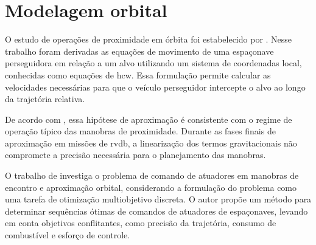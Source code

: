 \section{Modelagem orbital}
\label{sec_modelagem_orbital}

O estudo de operações de proximidade em órbita foi estabelecido por \cite{clohessy1960terminal}.
Nesse trabalho foram derivadas as equações de movimento de uma espaçonave perseguidora em relação a um alvo utilizando um sistema de coordenadas local, conhecidas como equações de \gls{hcw}.
Essa formulação permite calcular as velocidades necessárias para que o veículo perseguidor intercepte o alvo ao longo da trajetória relativa.

De acordo com \cite{fehse2003}, essa hipótese de aproximação é consistente com o regime de operação típico das manobras de proximidade. 
Durante as fases finais de aproximação em missões de \gls{rvdb}, a linearização dos termos gravitacionais não compromete a precisão necessária para o planejamento das manobras.

O trabalho de \cite{santos2015discrete} investiga o problema de comando de atuadores em manobras de encontro e aproximação orbital, considerando a formulação do problema como uma tarefa de otimização multiobjetivo discreta.
O autor propõe um método para determinar sequências ótimas de comandos de atuadores de espaçonaves, levando em conta objetivos conflitantes, como precisão da trajetória, consumo de combustível e esforço de controle.
